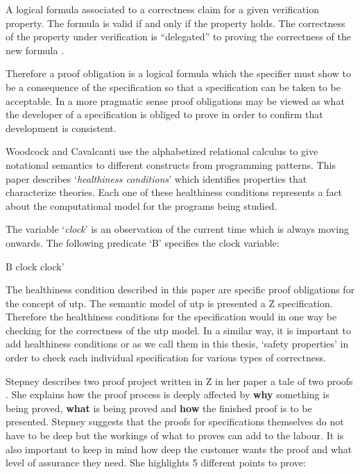\begin{defin}
A logical formula associated to a correctness claim for a given verification
property. The formula is valid if and only if the property holds. The
correctness of the property under verification is “delegated” to proving the
correctness of the new formula \cite{handbookofembed}.
\end{defin}

Therefore a proof obligation is a logical formula which the specifier must show
to be a consequence of the specification so that a specification can be taken to
be acceptable. In a more pragmatic sense proof obligations may be viewed as what
the developer of a specification is obliged to prove in order to confirm that
development is consistent.

Woodcock and Cavalcanti \cite{woodcock2004tutorial} use the alphabetized
relational calculus to give notational semantics to different constructs from
programming patterns. This paper describes `\emph{healthiness conditions}' which
identifies properties that characterize theories. Each one of these healthiness
conditions represents a fact about the computational model for the programs
being studied.

\begin{exam}
The variable `\emph{clock}' is an observation of the current time which is
always moving onwards. The following predicate `B' specifies the clock variable:

\begin{zed}
B  clock \leq clock'
\end{zed}
\end{exam}

The healthiness condition described in this paper are specific proof obligations
for the concept of \gls{utp}. The semantic model of \gls{utp} is presented a Z
specification. Therefore the healthiness conditions for the specification would
in one way be checking for the correctness of the \gls{utp} model. In a similar
way, it is important to add healthiness conditions or as we call them in this
thesis, `safety properties' in order to check each individual specification for
various types of correctness.

Stepney describes two proof project written in Z in her paper a tale of two
proofs \cite{stepney1998tale}. She explains how the proof process is deeply
affected by \textbf{why} something is being proved, \textbf{what} is being
proved and \textbf{how} the finished proof is to be presented. Stepney suggests
that the proofs for specifications themselves do not have to be deep but the
workings of what to proves can add to the labour. It is also important to keep
in mind how deep the customer wants the proof and what level of assurance they
need. She highlights 5 different points to prove:

